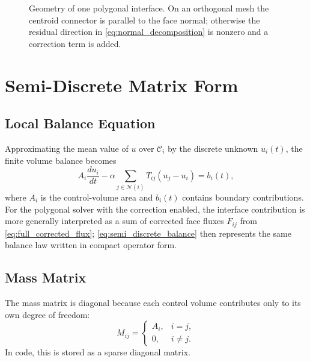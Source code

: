 \documentclass[11pt]{article}
\theoremstyle{plain}
\theoremstyle{definition}
\theoremstyle{remark}
\numberwithin{equation}{section}
\begin{document}
\begin{figure}[t]
\centering
{}
\caption{Geometry of one polygonal interface. On an orthogonal mesh the centroid connector is parallel to the face normal; otherwise the residual direction in \cref{eq:normal_decomposition} is nonzero and a correction term is added.}
\label{fig:nonorth_geometry}
\end{figure}

\section{Semi-Discrete Matrix Form}
\subsection{Local Balance Equation}
Approximating the mean value of $u$ over $\mathcal{C}_i$ by the discrete unknown $u_i(t)$, the finite volume balance becomes
\begin{equation}
\label{eq:semi_discrete_balance}
A_i \frac{d u_i}{dt}
- \alpha \sum_{j \in \mathcal{N}(i)} T_{ij}(u_j - u_i)
= b_i(t),
\end{equation}
where $A_i$ is the control-volume area and $b_i(t)$ contains boundary contributions.
For the polygonal solver with the correction enabled, the interface contribution is more generally interpreted as a sum of corrected face fluxes $F_{ij}$ from \cref{eq:full_corrected_flux}; \cref{eq:semi_discrete_balance} then represents the same balance law written in compact operator form.

\subsection{Mass Matrix}
The mass matrix is diagonal because each control volume contributes only to its own degree of freedom:
\begin{equation}
\label{eq:mass_matrix}
M_{ij} =
\begin{cases}
A_i, & i=j, \\
0, & i \neq j.
\end{cases}
\end{equation}
In code, this is stored as a sparse diagonal matrix.
\end{document}
